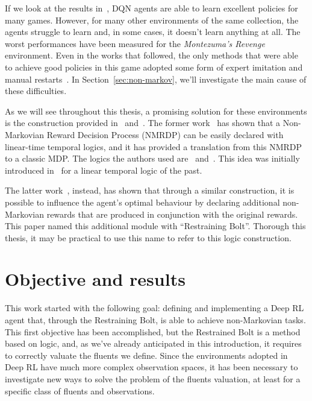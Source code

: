 If we look at the results in~\cite{bib:atari-deepq-nature}, DQN agents are
able to learn excellent policies for many games. However, for many other
environments of the same collection, the agents struggle to learn and, in some
cases, it doesn't learn anything at all. The worst performances have been
measured for the \emph{Montezuma's Revenge} environment. Even in the works
that followed, the only methods that were able to achieve good policies in
this game adopted some form of expert imitation and manual
restarts~\cite{bib:mz-openai-demonstrations}. In Section~\ref{sec:non-markov},
we'll investigate the main cause of these difficulties.

As we will see throughout this thesis, a promising solution for these
environments is the construction provided in~\cite{bib:degiacomo-logic-nmrdp}
and~\cite{bib:bolt}. The former work~\cite{bib:degiacomo-logic-nmrdp} has
shown that a Non-Markovian Reward Decision Process (NMRDP) can be easily
declared with linear-time temporal logics, and it has provided a translation
from this NMRDP to a classic MDP. The logics the authors used are~\ltl{}
and~\ldl{}.  This idea was initially introduced
in~\cite{bib:nmrdp-logic-first} for a linear temporal logic of the past.

The latter work~\cite{bib:bolt}, instead, has shown that through a similar
construction, it is possible to influence the agent's optimal behaviour by
declaring additional non-Markovian rewards that are produced in conjunction
with the original rewards. This paper named this additional module with
``Restraining Bolt''.  Thorough this thesis, it may be practical to use this
name to refer to this logic construction.


\section{Objective and results}

\label{sec:intro-objective}

This work started with the following goal: defining and implementing a Deep RL
agent that, through the Restraining Bolt, is able to achieve non-Markovian
tasks. This first objective has been accomplished, but the Restrained Bolt is
a method based on logic, and, as we've already anticipated in this
introduction, it requires to correctly valuate the fluents we define. Since
the environments adopted in Deep RL have much more complex observation spaces,
it has been necessary to investigate new ways to solve the problem of the
fluents valuation, at least for a specific class of fluents and observations.

